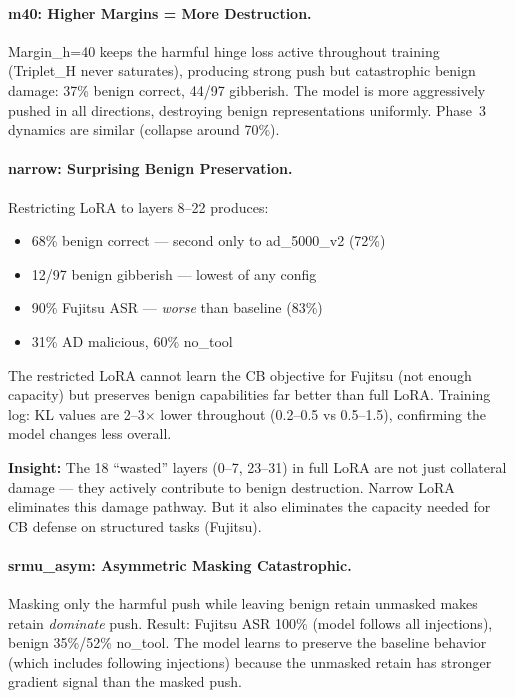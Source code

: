 \documentclass[11pt]{article}
\newcommand{\good}[1]{\textcolor{good}{#1}}
\newcommand{\bad}[1]{\textcolor{bad}{#1}}
\begin{document}
\paragraph{m40: Higher Margins = More Destruction.}
Margin\_h=40 keeps the harmful hinge loss active throughout training (Triplet\_H
never saturates), producing strong push but catastrophic benign damage:
37\% benign correct, 44/97 gibberish.  The model is more aggressively pushed
in all directions, destroying benign representations uniformly.
Phase~3 dynamics are similar (collapse around 70\%).

\paragraph{narrow: Surprising Benign Preservation.}
Restricting LoRA to layers 8--22 produces:
\begin{itemize}
  \item \good{68\% benign correct} --- second only to ad\_5000\_v2 (72\%)
  \item \good{12/97 benign gibberish} --- lowest of any config
  \item \bad{90\% Fujitsu ASR} --- \emph{worse} than baseline (83\%)
  \item 31\% AD malicious, 60\% no\_tool
\end{itemize}

The restricted LoRA cannot learn the CB objective for Fujitsu (not enough
capacity) but preserves benign capabilities far better than full LoRA.
Training log: KL values are 2--3$\times$ lower throughout (0.2--0.5 vs
0.5--1.5), confirming the model changes less overall.

\textbf{Insight:} The 18 ``wasted'' layers (0--7, 23--31) in full LoRA
are not just collateral damage --- they actively contribute to benign
destruction.  Narrow LoRA eliminates this damage pathway.  But it also
eliminates the capacity needed for CB defense on structured tasks (Fujitsu).

\paragraph{srmu\_asym: Asymmetric Masking Catastrophic.}
Masking only the harmful push while leaving benign retain unmasked makes
retain \emph{dominate} push.  Result: Fujitsu ASR 100\% (model follows
all injections), benign 35\%/52\% no\_tool.  The model learns to preserve
the baseline behavior (which includes following injections) because the
unmasked retain has stronger gradient signal than the masked push.
\end{document}
